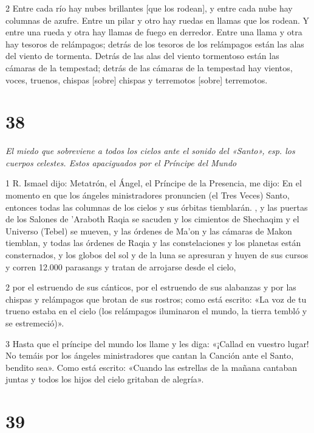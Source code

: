 \par 2 Entre cada río hay nubes brillantes [que los rodean], y entre cada nube hay columnas de azufre. Entre un pilar y otro hay ruedas en llamas que los rodean. Y entre una rueda y otra hay llamas de fuego en derredor. Entre una llama y otra hay tesoros de relámpagos; detrás de los tesoros de los relámpagos están las alas del viento de tormenta. Detrás de las alas del viento tormentoso están las cámaras de la tempestad; detrás de las cámaras de la tempestad hay vientos, voces, truenos, chispas [sobre] chispas y terremotos [sobre] terremotos.


\chapter{38}

\par \textit{El miedo que sobreviene a todos los cielos ante el sonido del «Santo», esp. los cuerpos celestes. Estos apaciguados por el Príncipe del Mundo}

\par 1 R. Ismael dijo: Metatrón, el Ángel, el Príncipe de la Presencia, me dijo: En el momento en que los ángeles ministradores pronuncien (el Tres Veces) Santo, entonces todas las columnas de los cielos y sus órbitas tiemblarán. , y las puertas de los Salones de 'Araboth Raqia se sacuden y los cimientos de Shechaqim y el Universo (Tebel) se mueven, y las órdenes de Ma'on y las cámaras de Makon tiemblan, y todas las órdenes de Raqia y las constelaciones y los planetas están consternados, y los globos del sol y de la luna se apresuran y huyen de sus cursos y corren 12.000 parasangs y tratan de arrojarse desde el cielo,

\par 2 por el estruendo de sus cánticos, por el estruendo de sus alabanzas y por las chispas y relámpagos que brotan de sus rostros; como está escrito: «La voz de tu trueno estaba en el cielo (los relámpagos iluminaron el mundo, la tierra tembló y se estremeció)».

\par 3 Hasta que el príncipe del mundo los llame y les diga: «¡Callad en vuestro lugar! No temáis por los ángeles ministradores que cantan la Canción ante el Santo, bendito sea». Como está escrito: «Cuando las estrellas de la mañana cantaban juntas y todos los hijos del cielo gritaban de alegría».



\chapter{39}

